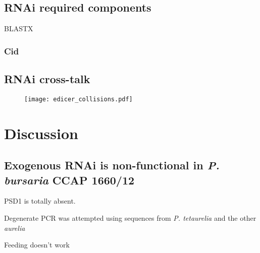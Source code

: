 \subsection{RNAi required components}

BLASTX



\subsubsection{Cid}





\subsection{RNAi cross-talk}

\begin{figure}
    \centering
    \texttt{[image: edicer\_collisions.pdf]}
    \caption[]{}
    \label{fig:edicer_collisions}
\end{figure}


\section{Discussion}

\subsection{Exogenous RNAi is non-functional in \textit{P. bursaria} CCAP 1660/12}

PSD1 is totally absent. 

Degenerate PCR was attempted using sequences from \textit{P. tetaurelia} and 
the other \textit{aurelia}


Feeding doesn't work 

